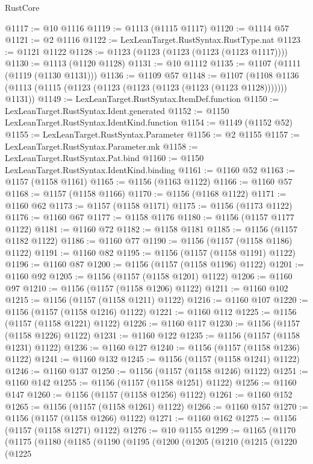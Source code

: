 \begin{lexlean}{RustCore}
\begin{coremodule}
@1117 := @10 @1116
@1119 := @1113 (@1115 @1117)
@1120 := @1114 @57
@1121 := @2 @1116
@1122 := LexLeanTarget.RustSyntax.RustType.nat
@1123 := @1121 @1122
@1128 := @1123 (@1123 (@1123 (@1123 (@1123 @1117))))
@1130 := @1113 (@1120 @1128)
@1131 := @10 @1112
@1135 := @1107 (@1111 (@1119 (@1130 @1131)))
@1136 := @1109 @57
@1148 := @1107
    (@1108 @1136 (@1113 (@1115 (@1123 (@1123 (@1123 (@1123 (@1123 (@1123 @1128))))))) @1131))
@1149 := LexLeanTarget.RustSyntax.ItemDef.function
@1150 := LexLeanTarget.RustSyntax.Ident.generated
@1152 := @1150 LexLeanTarget.RustSyntax.IdentKind.function
@1154 := @1149 (@1152 @52)
@1155 := LexLeanTarget.RustSyntax.Parameter
@1156 := @2 @1155
@1157 := LexLeanTarget.RustSyntax.Parameter.mk
@1158 := LexLeanTarget.RustSyntax.Pat.bind
@1160 := @1150 LexLeanTarget.RustSyntax.IdentKind.binding
@1161 := @1160 @52
@1163 := @1157 (@1158 @1161)
@1165 := @1156 (@1163 @1122)
@1166 := @1160 @57
@1168 := @1157 (@1158 @1166)
@1170 := @1156 (@1168 @1122)
@1171 := @1160 @62
@1173 := @1157 (@1158 @1171)
@1175 := @1156 (@1173 @1122)
@1176 := @1160 @67
@1177 := @1158 @1176
@1180 := @1156 (@1157 @1177 @1122)
@1181 := @1160 @72
@1182 := @1158 @1181
@1185 := @1156 (@1157 @1182 @1122)
@1186 := @1160 @77
@1190 := @1156 (@1157 (@1158 @1186) @1122)
@1191 := @1160 @82
@1195 := @1156 (@1157 (@1158 @1191) @1122)
@1196 := @1160 @87
@1200 := @1156 (@1157 (@1158 @1196) @1122)
@1201 := @1160 @92
@1205 := @1156 (@1157 (@1158 @1201) @1122)
@1206 := @1160 @97
@1210 := @1156 (@1157 (@1158 @1206) @1122)
@1211 := @1160 @102
@1215 := @1156 (@1157 (@1158 @1211) @1122)
@1216 := @1160 @107
@1220 := @1156 (@1157 (@1158 @1216) @1122)
@1221 := @1160 @112
@1225 := @1156 (@1157 (@1158 @1221) @1122)
@1226 := @1160 @117
@1230 := @1156 (@1157 (@1158 @1226) @1122)
@1231 := @1160 @122
@1235 := @1156 (@1157 (@1158 @1231) @1122)
@1236 := @1160 @127
@1240 := @1156 (@1157 (@1158 @1236) @1122)
@1241 := @1160 @132
@1245 := @1156 (@1157 (@1158 @1241) @1122)
@1246 := @1160 @137
@1250 := @1156 (@1157 (@1158 @1246) @1122)
@1251 := @1160 @142
@1255 := @1156 (@1157 (@1158 @1251) @1122)
@1256 := @1160 @147
@1260 := @1156 (@1157 (@1158 @1256) @1122)
@1261 := @1160 @152
@1265 := @1156 (@1157 (@1158 @1261) @1122)
@1266 := @1160 @157
@1270 := @1156 (@1157 (@1158 @1266) @1122)
@1271 := @1160 @162
@1275 := @1156 (@1157 (@1158 @1271) @1122)
@1276 := @10 @1155
@1299 := @1165
    (@1170
      (@1175
        (@1180
          (@1185
            (@1190
              (@1195
                (@1200
                  (@1205
                    (@1210
                      (@1215
                        (@1220
                          (@1225

\end{coremodule}
\end{lexlean}
